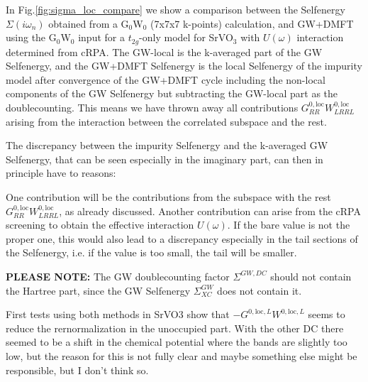 \documentclass[12pt,a4paper]{scrartcl}
\numberwithin{equation}{section}
\begin{document}
In Fig.\ref{fig:sigma_loc_compare} we show a comparison between the Selfenergy 
$\Sigma(i\omega_n)$ obtained from a G$_0$W$_0$ (7x7x7 k-points) calculation,
and GW+DMFT using the G$_0$W$_0$ input for a $t_{2g}$-only model for SrVO$_3$ with $U(\omega)$ interaction determined from cRPA.
The GW-local is the k-averaged part of the GW Selfenergy, and the GW+DMFT Selfenergy
is the local Selfenergy of the impurity model
after convergence of the GW+DMFT cycle including the non-local components
of the GW Selfenergy but subtracting the GW-local part as the doublecounting.
This means we have thrown away all contributions $G^{0,\mathrm{loc}}_{RR}W^{0,\mathrm{loc}}_{LRRL}$
arising from the interaction between the correlated subspace and the rest.

The discrepancy between the impurity Selfenergy and the k-averaged
GW Selfenergy, that can be seen especially in the imaginary part,
can then in principle have to reasons:

One contribution will be the contributions from the subspace
with the rest $G^{0,\mathrm{loc}}_{RR}W^{0,\mathrm{loc}}_{LRRL}$, as already discussed.
Another contribution can arise from the cRPA screening to obtain the effective
interaction $U(\omega)$. If the bare value is not the proper one, this would also
lead to a discrepancy especially in the tail sections of the Selfenergy, i.e.
if the value is too small, the tail will be smaller. 

\textbf{PLEASE NOTE:}
The GW doublecounting factor $\Sigma^{GW,DC}$ should not contain the Hartree
part, since the GW Selfenergy $\Sigma^{GW}_{XC}$ does not contain it.

First tests using both methods in SrVO3 show that $-G^{0,\mathrm{loc},L}W^{0,\mathrm{loc},L}$
seems to reduce the rernormalization in the unoccupied part.
With the other DC there seemed to be a shift in the chemical potential where
the bands are slightly too low, but the reason for this is not fully clear and
maybe something else might be responsible, but I don't think so.
\end{document}
